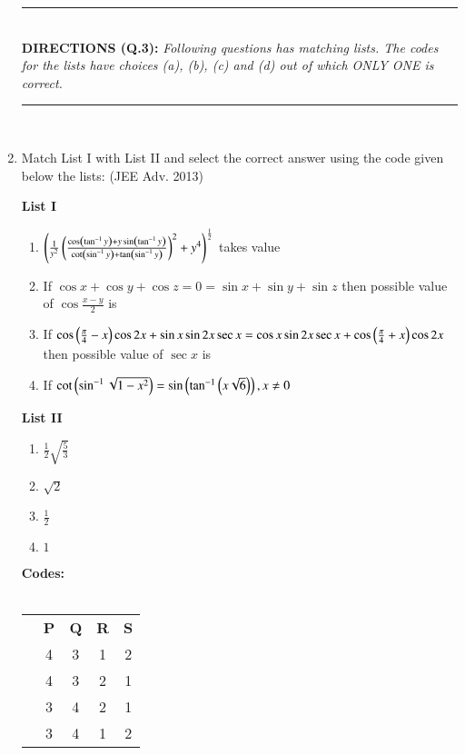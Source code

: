 \documentclass[journal]{IEEEtran}
\begin{document}
\begin{enumerate}
	\hrule
		\text{}\\
		\textbf{DIRECTIONS (Q.3): }\em Following questions has matching lists. The codes for the lists have choices (a), (b), (c) and (d) out of which ONLY ONE is correct.\em\\
	\hrule
	\text{}\\

	\item{	
		Match List I with List II and select the correct answer using the code given below the lists: \hfill (JEE Adv. 2013)
		\begin{multicols}{2}
			\textbf{List I}\\
			\begin{enumerate}
				\item{$\left(\frac{1}{y^2}\left(\frac{\cos\left(\tan^{-1}y\right)+y\sin\left(\tan^{-1}y\right)}{\cot\left(\sin^{-1}y\right)+\tan\left(\sin^{-1}y\right)}\right)^2 + y^4\right)^\frac{1}{2}$} takes value
				\item{If $\cos x+\cos y+\cos z = 0 = \sin x+\sin y+\sin z$ then possible value of $\cos\frac{x-y}{2}$ is}
				\item{If $\cos\left(\frac{\pi}{4}-x\right) \cos 2x+\sin x\sin 2x\sec x=\cos x\sin 2x\sec x+\cos\left(\frac{\pi}{4}+x\right)\cos 2x$ then possible value of $\sec x$ is}
				\item{If $\cot\left(\sin^{-1}\sqrt{1-x^2}\right)=\sin\left(\tan^{-1}\left(x\sqrt{6}\right)\right),x\neq 0$}
			\end{enumerate}
			\columnbreak
			\textbf{List II}\\
			\begin{enumerate}
				\item{$\frac{1}{2}\sqrt{\frac{5}{3}}$}
				\item{$\sqrt{2}$}
				\item{$\frac{1}{2}$}
				\item{$1$}
			\end{enumerate}
		\end{multicols}
		\textbf{Codes:}\\
		\\
		\begin{tabular}{c c c c c}
			& \textbf{P} & \textbf{Q} & \textbf{R} & \textbf{S} \\
			\brak{a} & 4 & 3 & 1 & 2 \\
			\brak{b} & 4 & 3 & 2 & 1 \\
			\brak{c} & 3 & 4 & 2 & 1 \\
			\brak{d} & 3 & 4 & 1 & 2 \\
		\end{tabular}
		}
\end{enumerate}
\end{document}
